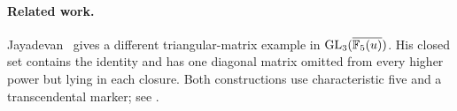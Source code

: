 
\paragraph{Related work.}
Jayadevan~\cite{jayadevan-16-28} gives a different triangular-matrix
example in \(\operatorname{GL}_3(\overline{\mathbb F_5(u)})\). His closed set contains
the identity and has one diagonal matrix omitted from every higher
power but lying in each closure. Both constructions use characteristic
five and a transcendental marker; see \comparisonlocation{}.
